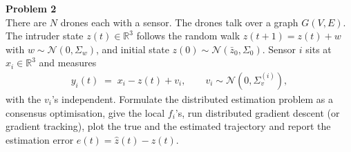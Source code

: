 \documentclass[a4paper, 11pt]{article}
\newenvironment{problem}[2][Problem]
    { \begin{mdframed}[backgroundcolor=gray!20] \textbf{#1 #2} \\}
    {  \end{mdframed}}
\begin{document}
\begin{problem}{2}
There are $N$ drones each with a sensor. The drones talk over a graph $G(V,E)$. The intruder state $z(t) \in \mathbb{R}^3$ follows the random walk $z(t+1) = z(t) + w$ with $w \sim \mathcal{N}(0, \Sigma_w)$, and initial state $z(0) \sim \mathcal{N}(\bar z_0, \Sigma_0)$. Sensor $i$ sits at $x_i \in \mathbb{R}^3$ and measures
\begin{align*}
    y_i(t) \;=\; x_i - z(t) + v_i, \qquad v_i \sim \mathcal{N}(0, \Sigma_v^{(i)}),
\end{align*}
with the $v_i$'s independent. Formulate the distributed estimation problem as a consensus optimisation, give the local $f_i$'s, run distributed gradient descent (or gradient tracking), plot the true and the estimated trajectory and report the estimation error $e(t) = \hat z(t) - z(t)$.
\end{problem}
\end{document}
